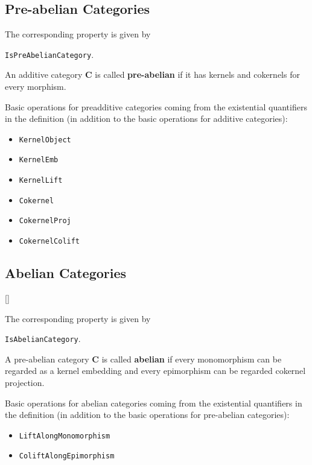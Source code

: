 \subsection{Pre-abelian Categories}

\begin{documentation}
 The corresponding \GAP property is given by
 \begin{center}
  \texttt{IsPreAbelianCategory}.  
 \end{center}
\end{documentation}

\begin{definition}
 An additive category $\mathbf{C}$ is called \textbf{pre-abelian} 
 if it has kernels and cokernels for every morphism.
\end{definition}

Basic operations for preadditive categories coming from the existential quantifiers
in the definition
(in addition to the basic operations for additive categories):
\begin{itemize}
 \item \texttt{KernelObject}
 \item \texttt{KernelEmb}
 \item \texttt{KernelLift}
 \item \texttt{Cokernel}
 \item \texttt{CokernelProj}
 \item \texttt{CokernelColift}
\end{itemize}


\subsection{Abelian Categories}[\cite{MLCWM}]

\begin{documentation}
 The corresponding \GAP property is given by
 \begin{center}
  \texttt{IsAbelianCategory}.  
 \end{center}
\end{documentation}

\begin{definition}
 A pre-abelian category $\mathbf{C}$ is called \textbf{abelian}
 if every monomorphism can be regarded as a kernel embedding
 and every epimorphism can be regarded cokernel projection.
\end{definition}

Basic operations for abelian categories coming from the existential quantifiers
in the definition
(in addition to the basic operations for pre-abelian categories):
\begin{itemize}
 \item \texttt{LiftAlongMonomorphism}
 \item \texttt{ColiftAlongEpimorphism}
\end{itemize}

